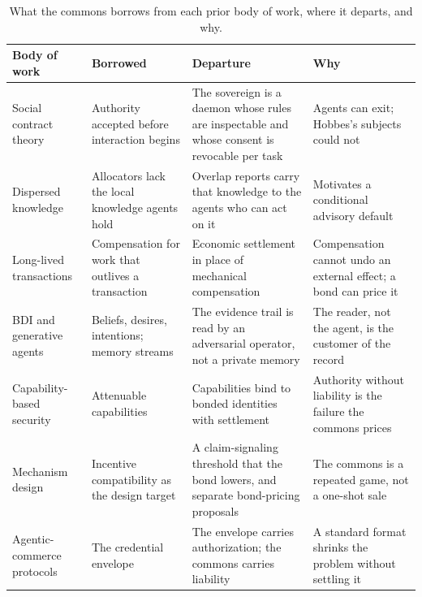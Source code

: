 \documentclass[11pt,a4paper]{article}
\theoremstyle{definition}
\theoremstyle{remark}
\begin{document}
\begin{table}[H]
\centering\small
\caption{What the commons borrows from each prior body of work, where it departs, and why.}
\label{tab:related-borrow-depart}\label{tab:related-borrow}
\begin{tabularx}{\textwidth}{@{}>{\raggedright\arraybackslash}p{} >{\raggedright\arraybackslash}X >{\raggedright\arraybackslash}X >{\raggedright\arraybackslash}X@{}}
\toprule
\textbf{Body of work} & \textbf{Borrowed} & \textbf{Departure} & \textbf{Why} \\
\midrule
Social contract theory & Authority accepted before interaction begins & The sovereign is a daemon whose rules are inspectable and whose consent is revocable per task & Agents can exit; Hobbes's subjects could not \\
Dispersed knowledge & Allocators lack the local knowledge agents hold & Overlap reports carry that knowledge to the agents who can act on it & Motivates a conditional advisory default \\
Long-lived transactions & Compensation for work that outlives a transaction & Economic settlement in place of mechanical compensation & Compensation cannot undo an external effect; a bond can price it \\
BDI and generative agents & Beliefs, desires, intentions; memory streams & The evidence trail is read by an adversarial operator, not a private memory & The reader, not the agent, is the customer of the record \\
Capability-based security & Attenuable capabilities & Capabilities bind to bonded identities with settlement & Authority without liability is the failure the commons prices \\
Mechanism design & Incentive compatibility as the design target & A claim-signaling threshold that the bond lowers, and separate bond-pricing proposals & The commons is a repeated game, not a one-shot sale \\
Agentic-commerce protocols & The credential envelope & The envelope carries authorization; the commons carries liability & A standard format shrinks the problem without settling it \\
\bottomrule
\end{tabularx}
\end{table}

\FloatBarrier

\end{document}
